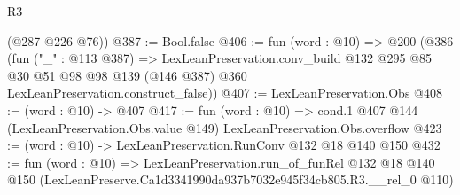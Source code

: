 \begin{lexlean}{R3}
\begin{coremodule}
      (@287 @226 @76))
@387 := Bool.false
@406 := fun (word : @10) =>
  @200
    (@386
      (fun ("_" : @113 @387) =>
      LexLeanPreservation.conv_build
        @132
        @295
        @85
        @30
        @51
        @98
        @98
        @139
        (@146 @387)
        @360
        LexLeanPreservation.construct_false))
@407 := LexLeanPreservation.Obs
@408 := (word : @10) -> @407
@417 := fun (word : @10) =>
  cond.{1} @407 @144 (LexLeanPreservation.Obs.value @149) LexLeanPreservation.Obs.overflow
@423 := (word : @10) -> LexLeanPreservation.RunConv @132 @18 @140 @150
@432 := fun (word : @10) =>
  LexLeanPreservation.run_of_funRel
    @132
    @18
    @140
    @150
    (LexLeanPreserve.Ca1d3341990da937b7032e945f34cb805.R3.__rel_0 @110)
\end{coremodule}
\end{lexlean}
